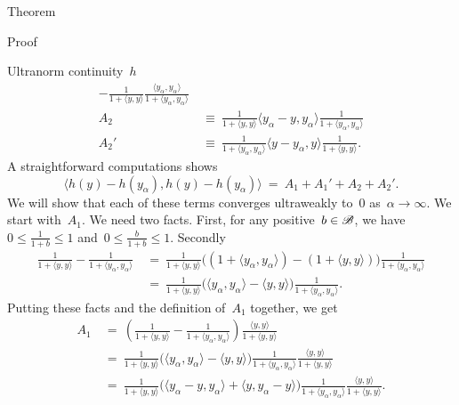 \documentclass[b]{subfiles}
\begin{document}
\begin{parsec}
\begin{point}{Theorem}
\begin{point}{Proof}
\begin{point}{Ultranorm continuity~$h$}
\begin{align*}
    - \frac{1}{1+\langle y,y \rangle}
    \frac{\langle y_\alpha,y_\alpha\rangle}{1+\langle y_\alpha,y_\alpha \rangle} \\
    A_2 & \ \equiv \ 
    \frac{1}{1+ \langle y,y \rangle}
       \langle y_\alpha- y, y_\alpha\rangle
     \frac{1}{1+ \langle y_\alpha,y_\alpha \rangle} \\
    A_2' & \ \equiv \  \frac{1}{1+ \langle y_\alpha,y_\alpha \rangle}
       \langle y- y_\alpha, y\rangle
     \frac{1}{1+ \langle y,y \rangle}.
\end{align*}
A straightforward computations shows
\begin{equation}\label{kaplansky-splitting}
    \langle h(y) - h(y_\alpha) ,
         h(y) - h(y_\alpha) \rangle  \ = \ A_1 + A_1' + A_2 + A_2'.
\end{equation}
We will show that each of these terms converges ultraweakly to~$0$
 as~$\alpha \to \infty$.
We start with~$A_1$.
We need two facts.
First, for any positive~$b \in \mathscr{B}$, we have~$0 \leq \frac{1}{1+b} \leq 1$
and~$0 \leq \frac{b}{1+b} \leq 1$.
Secondly
\begin{align*}
    \frac{1}{1+\langle y,y\rangle }
        -
    \frac{1}{1+\langle y_\alpha,y_\alpha\rangle }
    & \ = \ 
    \frac{1}{1+\langle y,y\rangle }
    \bigl((1+\langle y_\alpha,y_\alpha \rangle) - (1+\langle y,y \rangle)\bigr) 
    \frac{1}{1+\langle y_\alpha,y_\alpha\rangle }\\
    & \ = \ 
    \frac{1}{1+\langle y,y\rangle }
   \bigl(\langle y_\alpha,y_\alpha \rangle - \langle y,y \rangle\bigr) 
    \frac{1}{1+\langle y_\alpha,y_\alpha\rangle }.
\end{align*}
Putting these facts and the definition of~$A_1$ together, we get
\begin{align*}
     A_1 
    &\ = \ 
    \left(
    \frac{1}{1+\langle y,y\rangle } -
    \frac{1}{1+\langle y_\alpha,y_\alpha\rangle }\right)
            \frac{\langle y,y \rangle}{1+\langle y,y \rangle} \\
    &\ = \ 
    \frac{1}{1+\langle y,y\rangle }
   \bigl(\langle y_\alpha,y_\alpha \rangle - \langle y,y \rangle\bigr) 
    \frac{1}{1+\langle y_\alpha,y_\alpha\rangle }
            \frac{\langle y,y \rangle}{1+\langle y,y \rangle} \\
    &\ = \ 
    \frac{1}{1+\langle y,y\rangle }
   \bigl(\langle y_\alpha -y,y_\alpha \rangle + \langle y,y_\alpha - y \rangle\bigr) 
    \frac{1}{1+\langle y_\alpha,y_\alpha\rangle }
            \frac{\langle y,y \rangle}{1+\langle y,y \rangle}.
\end{align*}

\end{point}
\end{point}
\end{point}
\end{parsec}
\end{document}
